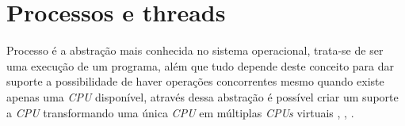 \chapter{Processos e threads}\label{cap:ProcessosThreads}

Processo é a abstração mais conhecida no sistema operacional, trata-se de ser uma execução de um programa, além que tudo depende deste conceito para  dar suporte a possibilidade de haver operações concorrentes mesmo quando existe apenas uma \emph{CPU} disponível, através dessa abstração é possível criar um suporte a \emph{CPU}   transformando uma única \emph{CPU}  em múltiplas \emph{CPUs}  virtuais \cite{Tanenbaum2016}, \cite{info2020}, \cite{Morimoto2011}. 






